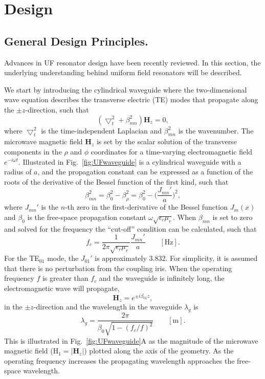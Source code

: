 \section{Design}
\subsection*{General Design Principles.}
Advances in UF resonator design have been recently reviewed. \cite{HydeUFRev2019} In this section, the underlying understanding behind uniform field resonators will be described.

We start by introducing the cylindrical waveguide where the two-dimensional wave equation describes the transverse electric (TE) modes that propagate along the $\pm z$-direction, such that
\begin{equation}
    (\bigtriangledown_t^2 + \beta_{mn}^2) \mathbf{H}_z = 0,
\end{equation}
where $\bigtriangledown_t^2$ is the time-independent Laplacian and $\beta_{mn}^2$ is the wavenumber. The microwave magnetic field $\mathbf{H}_z$ is set by the scalar solution of the transverse components in the $\rho$ and $\phi$ coordinates for a time-varying electromagnetic field $e^{-i \omega t}$. Illustrated in Fig.~\ref{fig:UFwaveguide} is a cylindrical waveguide with a radius of $a$, and the propagation constant can be expressed as a function of the roots of the derivative of the Bessel function of the first kind, such that
\begin{equation}
    \beta_{mn}^2 = \beta_0^2 - \beta_\rho^2 = \beta_0^2 - \bigg(\frac{J_{mn}'}{a}\bigg)^2,
\end{equation}
where $J_{mn}'$ is the $n$-th zero in the first-derivative of the Bessel function $J_m(x)$ and $\beta_0$ is the free-space propagation constant $\omega\sqrt{\epsilon_r \mu_r}$. When $\beta_{mn}$ is set to zero and solved for the frequency the ``cut-off'' condition can be calculated, such that
\begin{equation}
    f_c = \frac{1}{2 \pi \sqrt{\epsilon_r \mu_r}}\frac{J_{mn}'}{a} \qquad [\text{Hz}].
\end{equation}
For the TE$_{01}$ mode, the $J_{01}'$ is approximately 3.832. For simplicity, it is assumed that there is no perturbation from the coupling iris. When the operating frequency $f$ is greater than $f_c$ and the waveguide is infinitely long, the electromagnetic wave will propagate,
\begin{equation}
    \mathbf{H}_z = e^{\pm i\beta_{01}z},\label{propH}
\end{equation}
in the $\pm z$-direction and the wavelength in the waveguide $\lambda_g$ is 
\begin{equation}
    \lambda_g = \frac{2\pi}{\beta_0 \sqrt{1-(f_c/f)^2}} \qquad [\text{m}].\label{wavelength}
\end{equation}
This is illustrated in Fig.~\ref{fig:UFwaveguide}A as the magnitude of the microwave magnetic field (H$_1 = |\mathbf{H}_z|$) plotted along the axis of the geometry. As the operating frequency increases the propagating wavelength approaches the free-space wavelength. \cite{harrington1961time} 

